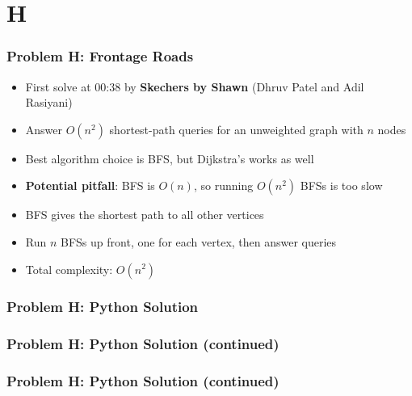 \section{H}%
\label{sec:h}

\begin{frame}
  \frametitle{Problem H: Frontage Roads}

  \begin{itemize}
    \item First solve at 00:38 by \textbf{Skechers by Shawn} (Dhruv Patel and Adil Rasiyani)
    \item Answer $O(n^2)$ shortest-path queries for an unweighted graph with $n$ nodes
    \item Best algorithm choice is BFS, but Dijkstra's works as well
    \item \textbf{Potential pitfall}: BFS is $O(n)$, so running $O(n^2)$ BFSs is too slow
    \item BFS gives the shortest path to all other vertices
    \item Run $n$ BFSs up front, one for each vertex, then answer queries
    \item Total complexity: $O(n^2)$
  \end{itemize}
\end{frame}

\begin{frame}
  \frametitle{Problem H: Python Solution}
\end{frame}

\begin{frame}
  \frametitle{Problem H: Python Solution (continued)}
\end{frame}

\begin{frame}
  \frametitle{Problem H: Python Solution (continued)}
\end{frame}
